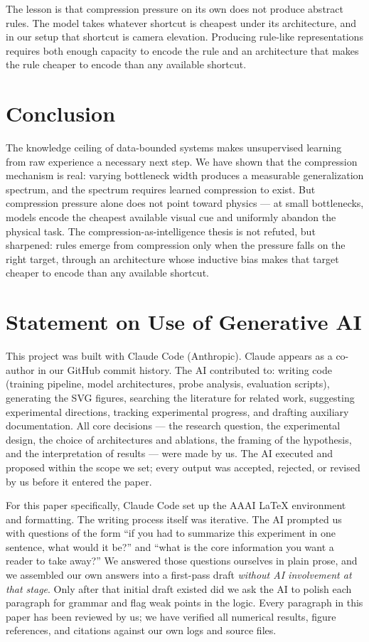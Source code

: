 \documentclass[letterpaper]{article} %
\begin{document}
The lesson is that compression pressure on its own does not produce abstract rules. The model takes whatever shortcut is cheapest under its architecture, and in our setup that shortcut is camera elevation. Producing rule-like representations requires both enough capacity to encode the rule and an architecture that makes the rule cheaper to encode than any available shortcut.

\section{Conclusion}

The knowledge ceiling of data-bounded systems makes unsupervised learning from raw experience a necessary next step. We have shown that the compression mechanism is real: varying bottleneck width produces a measurable generalization spectrum, and the spectrum requires learned compression to exist. But compression pressure alone does not point toward physics --- at small bottlenecks, models encode the cheapest available visual cue and uniformly abandon the physical task. The compression-as-intelligence thesis is not refuted, but sharpened: rules emerge from compression only when the pressure falls on the right target, through an architecture whose inductive bias makes that target cheaper to encode than any available shortcut.

\section{Statement on Use of Generative AI}

This project was built with Claude Code (Anthropic). Claude appears as a co-author in our GitHub commit history. The AI contributed to: writing code (training pipeline, model architectures, probe analysis, evaluation scripts), generating the SVG figures, searching the literature for related work, suggesting experimental directions, tracking experimental progress, and drafting auxiliary documentation. All core decisions --- the research question, the experimental design, the choice of architectures and ablations, the framing of the hypothesis, and the interpretation of results --- were made by us. The AI executed and proposed within the scope we set; every output was accepted, rejected, or revised by us before it entered the paper.

For this paper specifically, Claude Code set up the AAAI LaTeX environment and formatting. The writing process itself was iterative. The AI prompted us with questions of the form ``if you had to summarize this experiment in one sentence, what would it be?'' and ``what is the core information you want a reader to take away?'' We answered those questions ourselves in plain prose, and we assembled our own answers into a first-pass draft \emph{without AI involvement at that stage}. Only after that initial draft existed did we ask the AI to polish each paragraph for grammar and flag weak points in the logic. Every paragraph in this paper has been reviewed by us; we have verified all numerical results, figure references, and citations against our own logs and source files.
\end{document}
